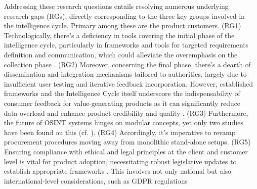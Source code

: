 \documentclass[10pt]{article}
\begin{document}
Addressing these research questions entails resolving numerous underlying research gaps (RGs),
directly corresponding to the three key groups involved in the intelligence cycle. Primary among
these are the product customers. (RG1) Technologically, there's a deficiency in tools covering the
initial phase of the intelligence cycle, particularly in frameworks and tools for targeted requirements
definition and communication, which could alleviate the overemphasis on the collection phase \cite{Lowenthal.2020}.
(RG2) Moreover, concerning the final phase, there's a dearth of dissemination and integration mechanisms
tailored to authorities, largely due to insufficient user testing and iterative feedback incorporation.
However, established frameworks and the Intelligence Cycle itself underscore the indispensability of
consumer feedback for value-generating products \cite{DirectorofNationalIntelligence.2011,JointChiefsofStaffU.S.Army.2013,NorthAtlanticTreatyOrganization.2001} as
it can significantly reduce data overload \cite{Gibson.2016} and enhance product credibility and quality \cite{Day.2016}.
(RG3) Furthermore, the future of OSINT systems hinges on modular concepts, yet only two studies have
been found on this (cf. \cite{Arjun.2020,Wright.2020}). (RG4) Accordingly, it's imperative to revamp
procurement procedures moving away from monolithic stand-alone setups. (RG5) Ensuring compliance with
ethical and legal principles at the client and customer level is vital for product adoption,
necessitating robust legislative updates to establish appropriate frameworks \cite{Ghioni.2023,Wittmer.2022}.
This involves not only national but also international-level considerations, such as GDPR regulations
\end{document}
